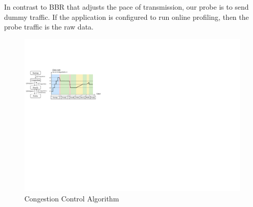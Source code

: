  In contrast to BBR that adjusts the pace
of transmission, our probe is to send dummy traffic. If the application is
configured to run online profiling, then the probe traffic is the raw data.

%     

\begin{figure}
  \centering
  \includegraphics[width=\columnwidth]{figures/cc.pdf}
  \caption{Congestion Control Algorithm}
  \label{fig:cc}
\end{figure}

